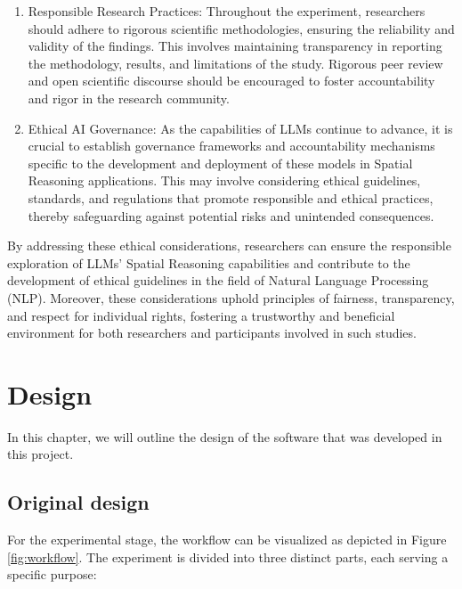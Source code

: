 \documentclass[twocolumn,11pt]{report}
\begin{document}
\begin{enumerate}
    \item Responsible Research Practices: Throughout the experiment, researchers should adhere to rigorous scientific methodologies, ensuring the reliability and validity of the findings. This involves maintaining transparency in reporting the methodology, results, and limitations of the study. Rigorous peer review and open scientific discourse should be encouraged to foster accountability and rigor in the research community.
    \item Ethical AI Governance: As the capabilities of LLMs continue to advance, it is crucial to establish governance frameworks and accountability mechanisms specific to the development and deployment of these models in Spatial Reasoning applications. This may involve considering ethical guidelines, standards, and regulations that promote responsible and ethical practices, thereby safeguarding against potential risks and unintended consequences.
\end{enumerate}
By addressing these ethical considerations, researchers can ensure the responsible exploration of LLMs' Spatial Reasoning capabilities and contribute to the development of ethical guidelines in the field of Natural Language Processing (NLP). Moreover, these considerations uphold principles of fairness, transparency, and respect for individual rights, fostering a trustworthy and beneficial environment for both researchers and participants involved in such studies.


\chapter{Design}\label{chap:design}

In this chapter, we will outline the design of the software that was
developed in this project.  

\section{Original design}\label{chap:first_design}
For the experimental stage, the workflow can be visualized as depicted in Figure \ref{fig:workflow}. The experiment is divided into three distinct parts, each serving a specific purpose:
\end{document}
